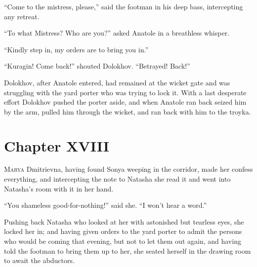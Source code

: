 ``Come to the mistress, please,'' said the footman in his deep
bass, intercepting any retreat.

``To what Mistress? Who are you?'' asked Anatole in a breathless
whisper.

``Kindly step in, my orders are to bring you in.''

``Kuragin! Come back!'' shouted Dolokhov. ``Betrayed! Back!''

Dolokhov, after Anatole entered, had remained at the wicket gate
and was struggling with the yard porter who was trying to lock
it. With a last desperate effort Dolokhov pushed the porter
aside, and when Anatole ran back seized him by the arm, pulled
him through the wicket, and ran back with him to the troyka.


\chapter*{Chapter XVIII}
\ifaudio     
{} 
\fi

\lettrine[lines=2, loversize=0.3, lraise=0]{\initfamily M}{arya}
Dmitrievna, having found Sonya weeping in the corridor,
made her confess everything, and intercepting the note to Natasha
she read it and went into Natasha's room with it in her hand.

``You shameless good-for-nothing!'' said she. ``I won't hear a
word.''

Pushing back Natasha who looked at her with astonished but
tearless eyes, she locked her in; and having given orders to the
yard porter to admit the persons who would be coming that
evening, but not to let them out again, and having told the
footman to bring them up to her, she seated herself in the
drawing room to await the abductors.

